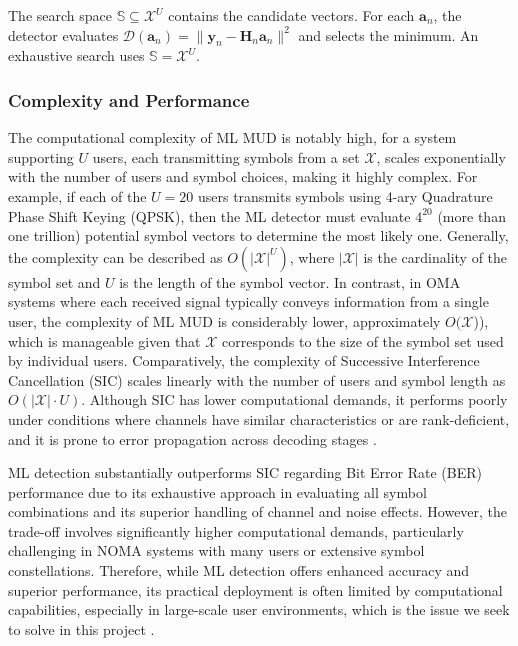 The search space $\mathbb{S}\subseteq\mathcal{X}^U$ contains the candidate vectors. For each $\mathbf{a}_n$, the detector evaluates $\mathcal{D}(\mathbf{a}_n)=\|\mathbf{y}_n-\mathbf{H}_n\mathbf{a}_n\|^2$ and selects the minimum. An exhaustive search uses $\mathbb{S}=\mathcal{X}^U$.



\subsubsection*{Complexity and Performance}

The computational complexity of ML MUD is notably high, for a system supporting \(U\) users, each transmitting symbols from a set \(\mathcal{X}\), scales exponentially with the number of users and symbol choices, making it highly complex. For example, if each of the \(U = 20\) users transmits symbols using 4-ary Quadrature Phase Shift Keying (QPSK), then the ML detector must evaluate \(4^{20}\) (more than one trillion) potential symbol vectors to determine the most likely one. Generally, the complexity can be described as \(O(|\mathcal{X}|^U)\), where \(|\mathcal{X}|\) is the cardinality of the symbol set and \(U\) is the length of the symbol vector.
In contrast, in OMA systems where each received signal typically conveys information from a single user, the complexity of ML MUD is considerably lower, approximately \(O(\mathcal{X}\))), which is manageable given that \(\mathcal{X}\) corresponds to the size of the symbol set used by individual users.
Comparatively, the complexity of Successive Interference Cancellation (SIC) scales linearly with the number of users and symbol length as \(O(|\mathcal{X}| \cdot U)\).
Although SIC has lower computational demands, it performs poorly under conditions where channels have similar characteristics or are rank-deficient, and it is prone to error propagation across decoding stages \cite{ML2}.



ML detection substantially outperforms SIC regarding Bit Error Rate (BER) performance due to its exhaustive approach in evaluating all symbol combinations and its superior handling of channel and noise effects. However, the trade-off involves significantly higher computational demands, particularly challenging in NOMA systems with many users or extensive symbol constellations. Therefore, while ML detection offers enhanced accuracy and superior performance, its practical deployment is often limited by computational capabilities, especially in large-scale user environments, which is the issue we seek to solve in this project \cite{ml}.







